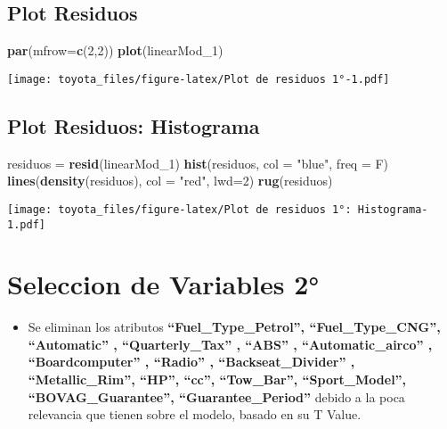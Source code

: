 \documentclass[]{article}
\newenvironment{Shaded}{\begin{snugshade}}{\end{snugshade}}
\newcommand{\DataTypeTok}[1]{\textcolor[rgb]{0.13,0.29,0.53}{#1}}
\newcommand{\DecValTok}[1]{\textcolor[rgb]{0.00,0.00,0.81}{#1}}
\newcommand{\KeywordTok}[1]{\textcolor[rgb]{0.13,0.29,0.53}{\textbf{#1}}}
\newcommand{\NormalTok}[1]{#1}
\newcommand{\StringTok}[1]{\textcolor[rgb]{0.31,0.60,0.02}{#1}}
\providecommand{\tightlist}{%
  \setlength{\itemsep}{0pt}\setlength{\parskip}{0pt}}
\begin{document}
\hypertarget{plot-residuos-1}{%
\subsection{Plot Residuos}\label{plot-residuos-1}}

\begin{Shaded}
\begin{Highlighting}[]
\KeywordTok{par}\NormalTok{(}\DataTypeTok{mfrow=}\KeywordTok{c}\NormalTok{(}\DecValTok{2}\NormalTok{,}\DecValTok{2}\NormalTok{))}
\KeywordTok{plot}\NormalTok{(linearMod_}\DecValTok{1}\NormalTok{)}
\end{Highlighting}
\end{Shaded}

\texttt{[image: toyota\_files/figure-latex/Plot de residuos 1°-1.pdf]}

\hypertarget{plot-residuos-histograma-1}{%
\subsection{Plot Residuos:
Histograma}\label{plot-residuos-histograma-1}}

\begin{Shaded}
\begin{Highlighting}[]
\NormalTok{residuos =}\StringTok{ }\KeywordTok{resid}\NormalTok{(linearMod_}\DecValTok{1}\NormalTok{)}
\KeywordTok{hist}\NormalTok{(residuos, }\DataTypeTok{col =} \StringTok{"blue"}\NormalTok{, }\DataTypeTok{freq =}\NormalTok{ F)}
\KeywordTok{lines}\NormalTok{(}\KeywordTok{density}\NormalTok{(residuos), }\DataTypeTok{col =} \StringTok{"red"}\NormalTok{, }\DataTypeTok{lwd=}\DecValTok{2}\NormalTok{)}
\KeywordTok{rug}\NormalTok{(residuos)}
\end{Highlighting}
\end{Shaded}

\texttt{[image: toyota\_files/figure-latex/Plot de residuos 1°: Histograma-1.pdf]}

\hypertarget{seleccion-de-variables-2}{%
\section{Seleccion de Variables 2°}\label{seleccion-de-variables-2}}

\begin{itemize}
\tightlist
\item
  Se eliminan los atributos \textbf{``Fuel\_Type\_Petrol'',
  ``Fuel\_Type\_CNG'', ``Automatic'' , ``Quarterly\_Tax'' , ``ABS'' ,
  ``Automatic\_airco'' , ``Boardcomputer'' , ``Radio'' ,
  ``Backseat\_Divider'' , ``Metallic\_Rim'', ``HP'', ``cc'',
  ``Tow\_Bar'', ``Sport\_Model'', ``BOVAG\_Guarantee'',
  ``Guarantee\_Period''} debido a la poca relevancia que tienen sobre el
  modelo, basado en su T Value.
\end{itemize}
\end{document}
